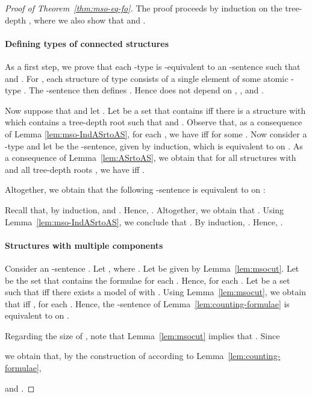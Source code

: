 \documentclass[11pt]{article}
\begin{document}
\begin{proof}[Proof of Theorem~\ref{thm:mso-eq-fo}]
  The proof proceeds by induction on the tree-depth , where we also show that
   and . 

  \paragraph{Defining types of connected structures}

  As a first step, we prove that each -type  is
  -equivalent to an -sentence
   such that  and .  For ,
  each structure  of type  consists of a
  single element of some atomic -type . The -sentence
   then defines . Hence
   does not depend on ,
  , and .

  Now suppose that  and let .  Let  be a set that contains
   iff there is a structure  with  which contains a tree-depth root
   such that  and
  .  Observe that, as a consequence of Lemma
  \ref{lem:mso-IndASrtoAS}, for each , we have
   iff  for some .  Now consider a -type 
  and let  be the -sentence, given by
  induction, which is equivalent to  on .  As a consequence of Lemma~\ref{lem:ASrtoAS}, we obtain
  that for all structures  with  and
  all tree-depth roots , we have
   iff .

  Altogether, we obtain that the following -sentence is equivalent to  on :
  
  
  Recall that, by induction, 
  and .  Hence,
  .  Altogether, we obtain that
  .  Using
  Lemma~\ref{lem:mso-IndASrtoAS}, we conclude that
  . By induction, . Hence, .

  \medskip

  \paragraph{Structures with multiple components}
  Consider an -sentence .  Let
  , where
  . Let  be given by
  Lemma~\ref{lem:msocut}.  Let  be the set that contains the
  formulae  for each
  . Hence,  for each .  Let  be a set such that  iff there exists a
  model  of  with
  .  Using
  Lemma~\ref{lem:msocut}, we obtain that  iff
  , for each
  . Hence, the -sentence
   of Lemma~\ref{lem:counting-formulae} is
  equivalent to  on .

  Regarding the size of , note that Lemma~\ref{lem:msocut} implies that
  .
  Since
  
  we obtain that, by the construction of  according to Lemma~\ref{lem:counting-formulae},
  
  and .
\end{proof}
\end{document}
